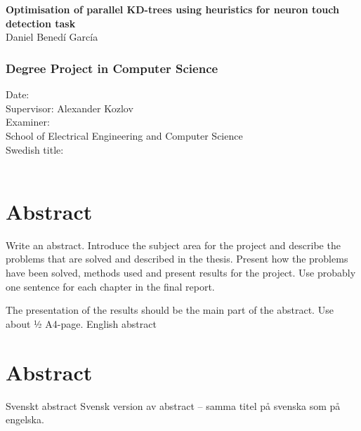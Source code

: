 \newpage
\thispagestyle{plain}
~\\
\begin{minipage}[b]{0.25\textwidth}
~\\
\end{minipage}
\begin{minipage}{0.65\textwidth}
\begin{flushleft}
{\fontsize{28}{24}\bf\sffamily Optimisation of parallel KD-trees using heuristics for neuron touch detection task\\}
\vspace{3cm}
{\fontsize{16}{18}\sffamily Daniel Benedí García}\\
\end{flushleft}
\end{minipage}
\vfill
{ 
	\subsection*{Degree Project in Computer Science}
	Date: \\
	Supervisor: Alexander Kozlov \\
	Examiner: \\
	School of Electrical Engineering and Computer Science \\
	Swedish title: \\
	~
}


\newpage
\thispagestyle{plain}
\chapter*{Abstract}
Write an abstract. Introduce the subject area for the project and describe the problems that are solved and described in the thesis. Present how the problems have been solved, methods used and present results for the project. Use probably one sentence for each chapter in the final report.

The presentation of the results should be the main part of the abstract. Use about ½ A4-page.
English abstract


\newpage
\thispagestyle{plain}
\chapter*{Abstract}
Svenskt abstract
Svensk version av abstract – samma titel på svenska som på engelska.

